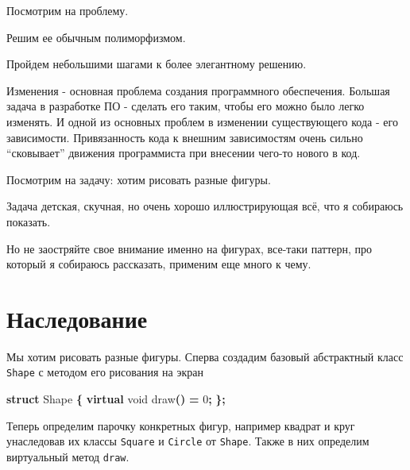 \documentclass[14pt,a4paper]{article}
\newenvironment{Shaded}{\begin{paragraph}}{\end{paragraph}}
\newenvironment{Highlighting}{\begin{paragraph}}{\end{paragraph}}
\newcommand{\KeywordTok}[1]{\textcolor[rgb]{0.13,0.29,0.53}{\textbf{#1}}}
\newcommand{\DataTypeTok}[1]{\textcolor[rgb]{0.13,0.29,0.53}{#1}}
\newcommand{\DecValTok}[1]{\textcolor[rgb]{0.00,0.00,0.81}{#1}}
\newcommand{\OperatorTok}[1]{\textcolor[rgb]{0.81,0.36,0.00}{\textbf{#1}}}
\newcommand{\NormalTok}[1]{#1}
\begin{document}
Посмотрим на проблему.

Решим ее обычным полиморфизмом.

Пройдем небольшими шагами к более элегантному решению.

Изменения - основная проблема создания программного обеспечения. Большая
задача в разработке ПО - сделать его таким, чтобы его можно было легко
изменять. И одной из основных проблем в изменении существующего кода -
его зависимости. Привязанность кода к внешним зависимостям очень сильно
``сковывает'' движения программиста при внесении чего-то нового в код.

Посмотрим на задачу: хотим рисовать разные фигуры.

Задача детская, скучная, но очень хорошо иллюстрирующая всё, что я
собираюсь показать.

Но не заостряйте свое внимание именно на фигурах, все-таки паттерн, про
который я собираюсь рассказать, применим еще много к чему.

\hypertarget{ux43dux430ux441ux43bux435ux434ux43eux432ux430ux43dux438ux435}{%
\section{Наследование}\label{ux43dux430ux441ux43bux435ux434ux43eux432ux430ux43dux438ux435}}

Мы хотим рисовать разные фигуры. Сперва создадим базовый абстрактный
класс \texttt{Shape} с методом его рисования на экран

\begin{Shaded}
\begin{Highlighting}
\KeywordTok{struct}\NormalTok{ Shape }\OperatorTok{\{}
    \KeywordTok{virtual} \DataTypeTok{void}\NormalTok{ draw}\OperatorTok{()} \OperatorTok{=} \DecValTok{0}\OperatorTok{;}
\OperatorTok{\};}
\end{Highlighting}
\end{Shaded}

Теперь определим парочку конкретных фигур, например квадрат и круг
унаследовав их классы \texttt{Square} и \texttt{Circle} от
\texttt{Shape}. Также в них определим виртуальный метод \texttt{draw}.
\end{document}
